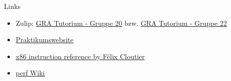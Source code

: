 \documentclass[
  german,            %
  aspectratio=169,    %
]{tumbeamer}
\begin{document}
\begin{frame}[fragile, c]{Links}{}
  \begin{itemize}
    \item Zulip: \href{https://zulip.in.tum.de/#narrow/stream/2267-GRA-Tutorium---Gruppe-20}{\glqq GRA Tutorium - Gruppe 20\grqq}
          bzw. \href{https://zulip.in.tum.de/#narrow/stream/2269-GRA-Tutorium---Gruppe-22}{\glqq GRA Tutorium - Gruppe 22\grqq}
    \item \href{https://gra.caps.in.tum.de}{Praktikumswebsite}
    \item \href{https://www.felixcloutier.com/x86/}{x86 instruction reference by Félix Cloutier}
    \item \href{https://perf.wiki.kernel.org/}{perf Wiki}
  \end{itemize}
\end{frame}

\maketitle
\end{document}
